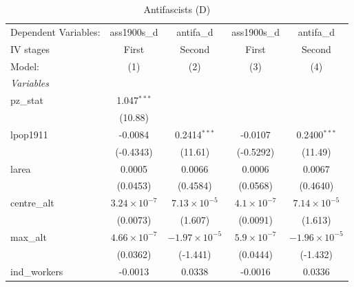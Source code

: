 
\begin{table}[htbp]
   \caption{Antifascists (D)}
   \centering
   \begin{tabular}{lcccc}
      \tabularnewline \midrule \midrule
      Dependent Variables:             & ass1900s\_d           & antifa\_d              & ass1900s\_d          & antifa\_d\\   
      IV stages                        & First                 & Second                 & First                & Second \\   
      Model:                           & (1)                   & (2)                    & (3)                  & (4)\\  
      \midrule
      \emph{Variables}\\
      pz\_stat                         & 1.047$^{***}$         &                        &                      &   \\   
                                       & (10.88)               &                        &                      &   \\   
      lpop1911                         & -0.0084               & 0.2414$^{***}$         & -0.0107              & 0.2400$^{***}$\\   
                                       & (-0.4343)             & (11.61)                & (-0.5292)            & (11.49)\\   
      larea                            & 0.0005                & 0.0066                 & 0.0006               & 0.0067\\   
                                       & (0.0453)              & (0.4584)               & (0.0568)             & (0.4640)\\   
      centre\_alt                      & $3.24\times 10^{-7}$  & $7.13\times 10^{-5}$   & $4.1\times 10^{-7}$  & $7.14\times 10^{-5}$\\    
                                       & (0.0073)              & (1.607)                & (0.0091)             & (1.613)\\   
      max\_alt                         & $4.66\times 10^{-7}$  & $-1.97\times 10^{-5}$  & $5.9\times 10^{-7}$  & $-1.96\times 10^{-5}$\\    
                                       & (0.0362)              & (-1.441)               & (0.0444)             & (-1.432)\\   
      ind\_workers                     & -0.0013               & 0.0338                 & -0.0016              & 0.0336\\   

\end{tabular}
\end{table}
